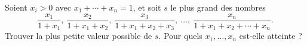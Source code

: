 Soient $x_i > 0$ avec $x_1 + \cdots + x_n = 1$, et soit $s$ le plus grand des nombres
\[ \frac{x_1}{1 + x_1},\ \frac{x_2}{1 + x_1 + x_2},\ \frac{x_3}{1 + x_1 + x_2 + x_3},\ \ldots,\ \frac{x_n}{1 + x_1 + x_2 + \cdots + x_n}. \]
Trouver la plus petite valeur possible de $s$. Pour quels $x_1, \ldots, x_n$ est-elle atteinte ?

